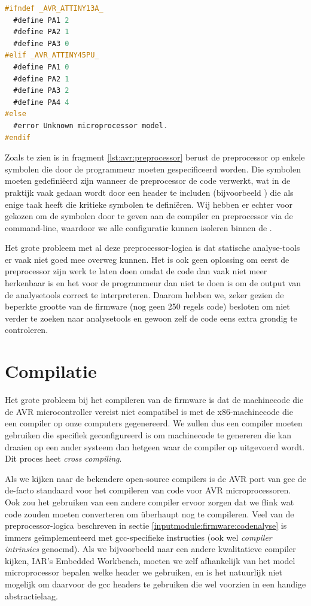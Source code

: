 \begin{lstlisting}[language=C, float, caption=Omzetten van AVR symbolen via preprocessor-logica., label=lst:avr:preprocessor]
#ifndef _AVR_ATTINY13A_
  #define PA1 2
  #define PA2 1
  #define PA3 0
#elif _AVR_ATTINY45PU_
  #define PA1 0
  #define PA2 1
  #define PA3 2
  #define PA4 4
#else
  #error Unknown microprocessor model.
#endif
\end{lstlisting}

Zoals te zien is in fragment \ref{lst:avr:preprocessor} berust de preprocessor op enkele symbolen die door de programmeur moeten gespecificeerd worden. Die symbolen moeten gedefiniëerd zijn wanneer de preprocessor de code verwerkt, wat in de praktijk vaak gedaan wordt door een header te includen (bijvoorbeeld ) die als enige taak heeft die kritieke symbolen te definiëren. Wij hebben er echter voor gekozen om de symbolen door te geven aan de compiler en preprocessor via de command-line, waardoor we alle configuratie kunnen isoleren binnen de .

Het grote probleem met al deze preprocessor-logica is dat statische analyse-tools er vaak niet goed mee overweg kunnen. Het is ook geen oplossing om eerst de preprocessor zijn werk te laten doen omdat de code dan vaak niet meer herkenbaar is en het voor de programmeur dan niet te doen is om de output van de analysetools correct te interpreteren. Daarom hebben we, zeker gezien de beperkte grootte van de firmware (nog geen 250 regels code) besloten om niet verder te zoeken naar analysetools en gewoon zelf de code eens extra grondig te controleren.

\section{Compilatie}

Het grote probleem bij het compileren van de firmware is dat de machinecode die de AVR microcontroller vereist niet compatibel is met de x86-machinecode die een compiler op onze computers gegenereerd. We zullen dus een compiler moeten gebruiken die specifiek geconfigureerd is om machinecode te genereren die kan draaien op een ander systeem dan hetgeen waar de compiler op uitgevoerd wordt. Dit proces heet \emph{cross compiling}.

Als we kijken naar de bekendere open-source compilers is de AVR port van \ac{gcc} de de-facto standaard voor het compileren van code voor AVR microprocessoren. Ook zou het gebruiken van een andere compiler ervoor zorgen dat we flink wat code zouden moeten converteren om überhaupt nog te compileren. Veel van de preprocessor-logica beschreven in sectie \ref{inputmodule:firmware:codenalyse} is immers geïmplementeerd met \ac{gcc}-specifieke instructies (ook wel \emph{compiler intrinsics} genoemd). Als we bijvoorbeeld naar een andere kwalitatieve compiler kijken, IAR's Embedded Workbench, moeten we zelf afhankelijk van het model microprocessor bepalen welke header we gebruiken, en is het natuurlijk niet mogelijk om daarvoor de \ac{gcc} headers te gebruiken die wel voorzien in een handige abstractielaag.

